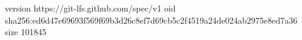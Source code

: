 version https://git-lfs.github.com/spec/v1
oid sha256:ed6d47e69693f569f69b3d26c8ef7d69cb5c2f4519a24de024ab2975e8ed7a36
size 101845
